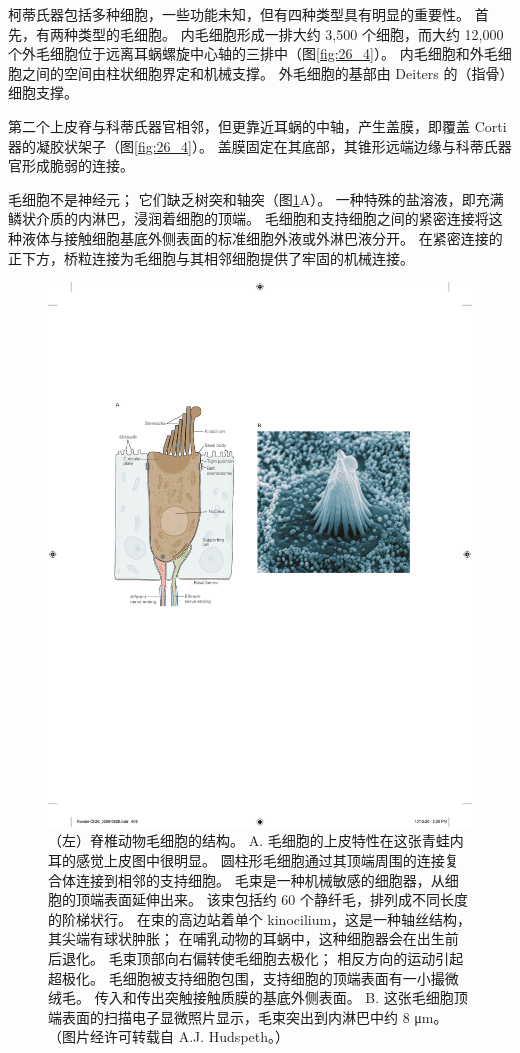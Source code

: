 柯蒂氏器包括多种细胞，一些功能未知，但有四种类型具有明显的重要性。 
首先，有两种类型的毛细胞。 
内毛细胞形成一排大约 3,500 个细胞，而大约 12,000 个外毛细胞位于远离耳蜗螺旋中心轴的三排中（图\ref{fig:26_4}）。 
内毛细胞和外毛细胞之间的空间由柱状细胞界定和机械支撑。 
外毛细胞的基部由 Deiters 的（指骨）细胞支撑。


第二个上皮脊与科蒂氏器官相邻，但更靠近耳蜗的中轴，产生盖膜，即覆盖 Corti 器的凝胶状架子（图\ref{fig:26_4}）。 
盖膜固定在其底部，其锥形远端边缘与科蒂氏器官形成脆弱的连接。


毛细胞不是神经元； 它们缺乏树突和轴突（图\ref{fig:26_5}A）。 
一种特殊的盐溶液，即充满鳞状介质的内淋巴，浸润着细胞的顶端。 
毛细胞和支持细胞之间的紧密连接将这种液体与接触细胞基底外侧表面的标准细胞外液或外淋巴液分开。 
在紧密连接的正下方，桥粒连接为毛细胞与其相邻细胞提供了牢固的机械连接。


\begin{figure}[htbp]
	\centering
	\includegraphics[width=0.5\linewidth]{chap26/fig_26_5}
	\caption{（左）脊椎动物毛细胞的结构。 
		A. 毛细胞的上皮特性在这张青蛙内耳的感觉上皮图中很明显。 
		圆柱形毛细胞通过其顶端周围的连接复合体连接到相邻的支持细胞。 
		毛束是一种机械敏感的细胞器，从细胞的顶端表面延伸出来。 
		该束包括约 60 个静纤毛，排列成不同长度的阶梯状行。 在束的高边站着单个 kinocilium，这是一种轴丝结构，其尖端有球状肿胀； 在哺乳动物的耳蜗中，这种细胞器会在出生前后退化。 毛束顶部向右偏转使毛细胞去极化； 相反方向的运动引起超极化。 毛细胞被支持细胞包围，支持细胞的顶端表面有一小撮微绒毛。 传入和传出突触接触质膜的基底外侧表面。 
		B. 这张毛细胞顶端表面的扫描电子显微照片显示，毛束突出到内淋巴中约 8 μm。 （图片经许可转载自 A.J. Hudspeth。）}
	\label{fig:26_5}
\end{figure}


